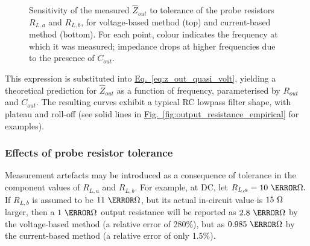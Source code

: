 \documentclass[conference]{IEEEtran}
\newcommand{\briefeqlink}[1]{\hyperref[#1]{Eq.~\ref*{#1}}\xspace }
\newcommand{\brieffiglink}[1]{\hyperref[#1]{Fig.~\ref*{#1}}}
\begin{document}
\begin{figure}[t!]

\begin{subfigure}{\textwidth}
\hspace{-4.8cm}
\caption*{}
\label{fig:measurement_sensitivity_voltage}
\end{subfigure}

\begin{subfigure}{\textwidth}
\hspace{-4.8cm}
\caption*{}
\label{fig:measurement_sensitivity_current}
\end{subfigure}

\caption{\small Sensitivity of the measured $\hat{Z}_{out}$ to tolerance of the probe resistors $R_{L,a}$ and $R_{L,b}$, for voltage-based method (top) and current-based method (bottom). For each point, colour indicates the frequency at which it was measured; impedance drops at higher frequencies due to the presence of $C_{out}$.}
\label{fig:measurement_sensitivity}
\end{figure}
This expression is substituted into \briefeqlink{eq:z_out_quasi_volt}, yielding a theoretical prediction for $\hat{Z}_{out}$ as a function of frequency, parameterised by $R_{out}$ and $C_{out}$. The resulting curves exhibit a typical RC lowpass filter shape, with plateau and roll-off (see solid lines in \brieffiglink{fig:output_resistance_empirical} for examples).

\subsubsection{Effects of probe resistor tolerance}
\label{sec:probe_resistor_effects}

Measurement artefacts may be introduced as a consequence of tolerance in the component values of $R_{L,a}$ and $R_{L,b}$. For example, at DC, let $R_{L,a}=10~\kilo\ohm.$ If $R_{L,b}$ is assumed to be $11~\kilo\ohm$, but its actual in-circuit value is $15~\ohm$ larger, then a $1~\mega\ohm$ output resistance will be reported as $2.8~\mega\ohm$ by the voltage-based method (a relative error of 280\%), but as $0.985~\mega\ohm$ by the current-based method (a relative error of only 1.5\%).
\end{document}
